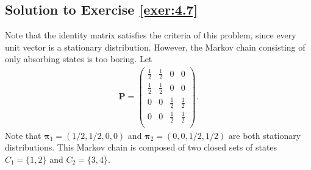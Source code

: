 \documentclass[12pt]{book}
\numberwithin{equation}{chapter}
\theoremstyle{plain}
\numberwithin{theorem}{section}
\theoremstyle{definition}
\numberwithin{exercise}{chapter}
\newcommand{\<}{\langle}
\renewcommand{\>}{\rangle}
\renewcommand{\(}{\left(}
\renewcommand{\)}{\right)}
\renewcommand{\[}{\left[}
\renewcommand{\]}{\right]}
\newcommand\Pv{\pmb{P}}
\newcommand\piv{\pmb{\pi}}
\begin{document}
\subsection*{Solution to Exercise \ref{exer:4.7}}
Note that the identity matrix satisfies the criteria of this problem, since every unit vector is a stationary 
distribution. However, the Markov chain consisting of only absorbing states is too boring. Let 
\begin{align}
\Pv
	= 
\left(
\begin{array}{cccc}
 \frac{1}{2} & \frac{1}{2} & 0 & 0 \\
 \frac{1}{2} & \frac{1}{2} & 0 & 0 \\
 0 & 0 & \frac{1}{2} & \frac{1}{2} \\
 0 & 0 & \frac{1}{2} & \frac{1}{2} \\
\end{array}
\right).
\end{align}
Note that $\piv_1 = (1/2,1/2,0,0)$ and $\piv_2 = (0,0,1/2,1/2)$ are both stationary distributions. This Markov 
chain is composed of two closed sets of states $C_1 = \{ 1,2\}$ and $C_2=\{ 3,4\}$.
\end{document}
